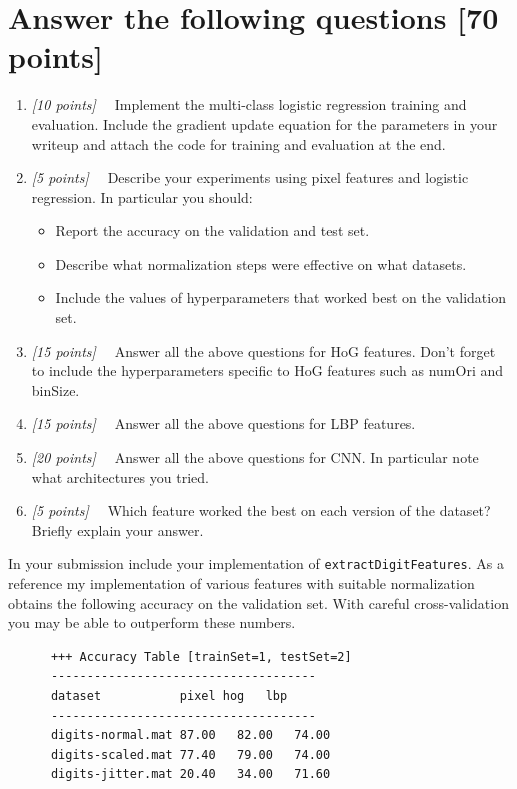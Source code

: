 \documentclass[10pt,letterpaper]{article}
\newcommand{\cmd}[1] {{\color{blue}\texttt{#1}}}
\newcommand{\points}[1]{{\color{mygreen}\emph{[#1]\ \ }}}
\begin{document}

\section{Answer the following questions [70 points]}
\begin{enumerate}
\item \points{10 points} Implement the multi-class logistic regression training and evaluation. Include the gradient update equation for the parameters in your writeup and attach the code for training and evaluation at the end.
\item \points{5 points} Describe your experiments using pixel features and logistic regression. In particular you should:
\begin{itemize}
\item Report the accuracy on the validation and test set.
\item Describe what normalization steps were effective on what datasets.
\item Include the values of hyperparameters that worked best on the validation set.
\end{itemize}
\item \points{15 points} Answer all the above questions for HoG
  features. Don't forget to include the hyperparameters specific to
  HoG features such as numOri and binSize.
\item \points{15 points} Answer all the above questions for LBP features.
\item \points{20 points} Answer all the above questions for CNN. In particular note what architectures you tried.
\item \points{5 points} Which feature worked the best on each version of the
  dataset? Briefly explain your answer.

\end{enumerate}

In your submission include your implementation of \cmd{extractDigitFeatures}. As a reference my implementation of various features with suitable normalization obtains the following accuracy on the validation set. With careful cross-validation you may be able to outperform these numbers.

\begin{verbatim}
      +++ Accuracy Table [trainSet=1, testSet=2]
      -------------------------------------
      dataset           pixel hog   lbp	
      -------------------------------------
      digits-normal.mat	87.00	82.00	74.00	
      digits-scaled.mat	77.40	79.00	74.00	
      digits-jitter.mat	20.40	34.00	71.60	
\end{verbatim}
\end{document}
